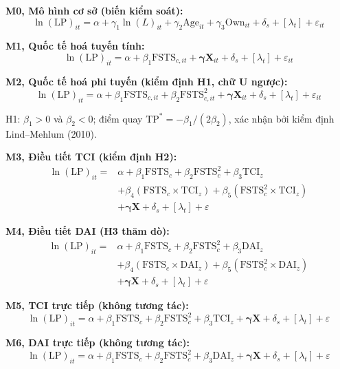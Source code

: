 \documentclass[
  a4paper,
  13pt]{extreport}
\begin{document}
\textbf{M0, Mô hình cơ sở (biến kiểm soát):}
\[\ln(\mathrm{LP})_{it} = \alpha + \gamma_1 \ln(L)_{it} + \gamma_2 \mathrm{Age}_{it} + \gamma_3 \mathrm{Own}_{it} + \delta_s + [\lambda_t] + \varepsilon_{it}\]

\textbf{M1, Quốc tế hoá tuyến tính:}
\[\ln(\mathrm{LP})_{it} = \alpha + \beta_1 \mathrm{FSTS}_{c,it} + \boldsymbol{\gamma}\mathbf{X}_{it} + \delta_s + [\lambda_t] + \varepsilon_{it}\]

\textbf{M2, Quốc tế hoá phi tuyến (kiểm định H1, chữ U ngược):}
\[\ln(\mathrm{LP})_{it} = \alpha + \beta_1 \mathrm{FSTS}_{c,it} + \beta_2 \mathrm{FSTS}_{c,it}^{2} + \boldsymbol{\gamma}\mathbf{X}_{it} + \delta_s + [\lambda_t] + \varepsilon_{it}\]

H1: \(\beta_1 > 0\) và \(\beta_2 < 0\); điểm quay
\(\mathrm{TP}^{*} = -\beta_1 / (2\beta_2)\), xác nhận bởi kiểm định
Lind--Mehlum (2010).

\textbf{M3, Điều tiết TCI (kiểm định H2):} \[\begin{aligned}
\ln(\mathrm{LP})_{it} = {} & \alpha + \beta_1 \mathrm{FSTS}_{c} + \beta_2 \mathrm{FSTS}_{c}^{2} + \beta_3 \mathrm{TCI}_{z} \\
& + \beta_4(\mathrm{FSTS}_{c} \times \mathrm{TCI}_{z}) + \beta_5(\mathrm{FSTS}_{c}^{2} \times \mathrm{TCI}_{z}) \\
& + \boldsymbol{\gamma}\mathbf{X} + \delta_s + [\lambda_t] + \varepsilon
\end{aligned}\]

\textbf{M4, Điều tiết DAI (H3 thăm dò):} \[\begin{aligned}
\ln(\mathrm{LP})_{it} = {} & \alpha + \beta_1 \mathrm{FSTS}_{c} + \beta_2 \mathrm{FSTS}_{c}^{2} + \beta_3 \mathrm{DAI}_{z} \\
& + \beta_4(\mathrm{FSTS}_{c} \times \mathrm{DAI}_{z}) + \beta_5(\mathrm{FSTS}_{c}^{2} \times \mathrm{DAI}_{z}) \\
& + \boldsymbol{\gamma}\mathbf{X} + \delta_s + [\lambda_t] + \varepsilon
\end{aligned}\]

\textbf{M5, TCI trực tiếp (không tương tác):}
\[\ln(\mathrm{LP})_{it} = \alpha + \beta_1 \mathrm{FSTS}_{c} + \beta_2 \mathrm{FSTS}_{c}^{2} + \beta_3 \mathrm{TCI}_{z} + \boldsymbol{\gamma}\mathbf{X} + \delta_s + [\lambda_t] + \varepsilon\]

\textbf{M6, DAI trực tiếp (không tương tác):}
\[\ln(\mathrm{LP})_{it} = \alpha + \beta_1 \mathrm{FSTS}_{c} + \beta_2 \mathrm{FSTS}_{c}^{2} + \beta_3 \mathrm{DAI}_{z} + \boldsymbol{\gamma}\mathbf{X} + \delta_s + [\lambda_t] + \varepsilon\]
\end{document}
